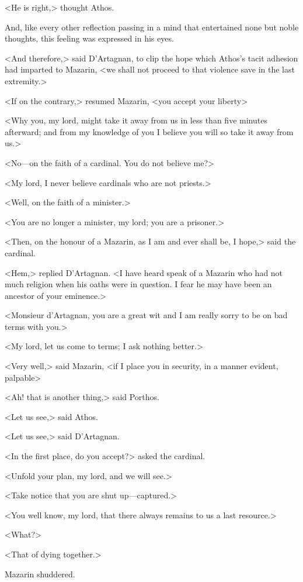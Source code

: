 <He is right,> thought Athos.

And, like every other reflection passing in a mind that entertained none but noble thoughts, this feeling was expressed in his eyes.

<And therefore,> said D'Artagnan, to clip the hope which Athos's tacit adhesion had imparted to Mazarin, <we shall not proceed to that violence save in the last extremity.>

<If on the contrary,> resumed Mazarin, <you accept your liberty\longdash>

<Why you, my lord, might take it away from us in less than five minutes afterward; and from my knowledge of you I believe you will so take it away from us.>

<No—on the faith of a cardinal. You do not believe me?>

<My lord, I never believe cardinals who are not priests.>

<Well, on the faith of a minister.>

<You are no longer a minister, my lord; you are a prisoner.>

<Then, on the honour of a Mazarin, as I am and ever shall be, I hope,> said the cardinal.

<Hem,> replied D'Artagnan. <I have heard speak of a Mazarin who had not much religion when his oaths were in question. I fear he may have been an ancestor of your eminence.>

<Monsieur d'Artagnan, you are a great wit and I am really sorry to be on bad terms with you.>

<My lord, let us come to terms; I ask nothing better.>

<Very well,> said Mazarin, <if I place you in security, in a manner evident, palpable\longdash>

<Ah! that is another thing,> said Porthos.

<Let us see,> said Athos.

<Let us see,> said D'Artagnan.

<In the first place, do you accept?> asked the cardinal.

<Unfold your plan, my lord, and we will see.>

<Take notice that you are shut up—captured.>

<You well know, my lord, that there always remains to us a last resource.>

<What?>

<That of dying together.>

Mazarin shuddered.

